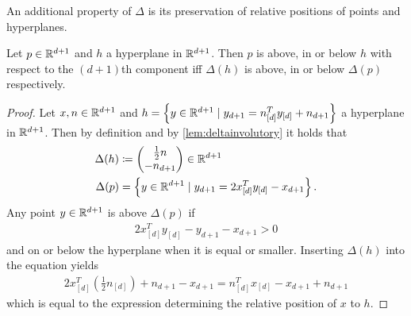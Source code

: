 An additional property of $\Delta$ is its preservation of relative positions of points and hyperplanes.
\begin{lemma}
    \label{lem:relativepositions}
    Let $p \in \mathbb{R}^{d+1}$ and $h$ a hyperplane in $\mathbb{R}^{d+1}$.
    Then $p$ is above, in or below $h$ with respect to the $(d+1)$th component iff $\Delta(h)$ is above, in or below $\Delta(p)$ respectively.
\end{lemma}
\begin{proof}
    Let $x,n \in \mathbb{R}^{d+1}$ and $h = \left\{ y \in \mathbb{R}^{d+1} \mid y_{d+1} = n_{[d]}^Ty_{[d]} + n_{d+1} \right\}$ a hyperplane in $\mathbb{R}^{d+1}$.
    Then by definition and by \cref{lem:deltainvolutory} it holds that
    \begin{align}
        \Delta(h) &\coloneqq \begin{pmatrix} \frac{1}{2} n \\ -n_{d+1} \end{pmatrix}  \in \mathbb{R}^{d+1}\\
        \Delta(p) &= \left\{ y \in \mathbb{R}^{d+1} \mid y_{d+1} = 2x_{[d]}^Ty_{[d]} - x_{d+1} \right\}.
    \end{align}
    Any point $y \in \mathbb{R}^{d+1}$ is above $\Delta(p)$ if
    \begin{align}
        2x_{[d]}^Ty_{[d]} - y_{d+1} - x_{d+1} > 0
    \end{align}
    and on or below the hyperplane when it is equal or smaller.
    Inserting $\Delta(h)$ into the equation yields
    \begin{align}
        2x_{[d]}^T \left( \frac{1}{2}n_{[d]} \right) + n_{d+1} - x_{d+1} = n_{[d]}^Tx_{[d]} - x_{d+1} + n_{d+1}
    \end{align}
    which is equal to the expression determining the relative position of $x$ to $h$.
\end{proof}


